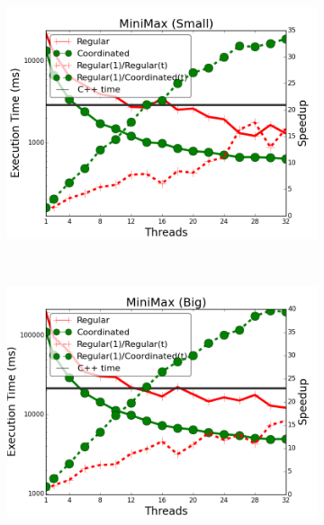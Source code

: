 \begin{figure}[]
        \centering
        \begin{subfigure}[b]{\plotsize\textwidth}
           \includegraphics[width=\textwidth]{experiments/coordination/cmp-min-max-tictactoe-small.png}
           \label{fig:coordination:coord_minimax_small}
        \end{subfigure}
        ~
        \begin{subfigure}[b]{\plotsize\textwidth}
           \includegraphics[width=\textwidth]{experiments/coordination/cmp-min-max-tictactoe-big.png}
           \label{fig:coordination:coord_minimax_big}
        \end{subfigure} \\


        \label{fig:coordination:results_minmax}
\end{figure}


